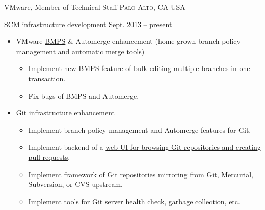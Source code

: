 \documentclass[10pt,letterpaper]{article}
\begin{document}
\headedsection
{VMware, Member of Technical Staff}
{\textsc{Palo Alto, CA USA}} {
\headedsubsection 
{SCM infrastructure development} {Sept. 2013 -- present}
{
    \begin{itemize}
        \item VMware \href{http://bmps.eng.vmware.com}{BMPS} \& Automerge
            enhancement (home-grown branch policy management and automatic
            merge tools)
            \begin{itemize}
                \item Implement new BMPS feature of bulk editing multiple
                    branches in one transaction.
                \item Fix bugs of BMPS and Automerge.
            \end{itemize}
        \item Git infrastructure enhancement
            \begin{itemize}
                \item Implement branch policy management and Automerge features
                    for Git.
                \item Implement backend of a 
                    \href{http://git.eng.vmware.com}{web UI for browsing Git
                    repositories and creating pull requests}.
                \item Implement framework of Git repositories mirroring from
                    Git, Mercurial, Subversion, or CVS upstream.
                \item Implement tools for Git server health check, garbage
                    collection, etc.
            \end{itemize}

    \end{itemize}
}
}
\end{document}
